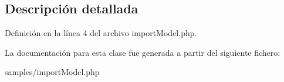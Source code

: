 \subsection{\-Descripción detallada}


\-Definición en la línea 4 del archivo import\-Model.\-php.



\-La documentación para esta clase fue generada a partir del siguiente fichero\-:\begin{DoxyCompactItemize}
\item 
samples/import\-Model.\-php\end{DoxyCompactItemize}

